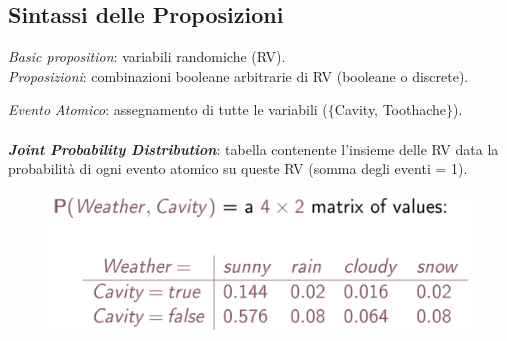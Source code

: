 \documentclass[a4paper, notitlepage, 9pt]{extreport}
\begin{document}
\subsection*{Sintassi delle Proposizioni}
\textit{Basic proposition}: variabili randomiche (RV).\\
\textit{Proposizioni}: combinazioni booleane arbitrarie di RV (booleane o discrete).
\begin{multicols}{2}
	\noindent
	\textit{Evento Atomico}: assegnamento di tutte le variabili ($\{$Cavity, Toothache$\}$).\\\\
	\textit{\textbf{Joint Probability Distribution}}: tabella contenente l'insieme delle RV data la probabilità di ogni evento atomico su queste RV (somma degli eventi = 1).
\columnbreak
	\begin{figure}[H]
		\centering
		\includegraphics[scale=0.29]{JointProb}
	\end{figure}
\end{multicols}
\end{document}
